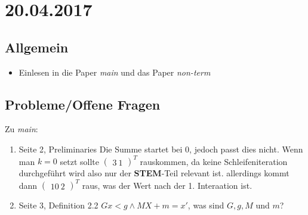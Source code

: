 \section*{20.04.2017}

\subsection*{Allgemein}
\begin{itemize}
	\item Einlesen in die Paper \textit{main} und das Paper \textit{non-term}
\end{itemize}



\subsection*{Probleme/Offene Fragen}
Zu \textit{main}:
\begin{enumerate}
	\item Seite 2, Preliminaries \newline
		Die Summe startet bei 0, jedoch passt dies nicht. Wenn man $k=0$ setzt sollte $\begin{pmatrix}3\ 1\end{pmatrix}^T$ rauskommen, da keine Schleifeniteration durchgeführt wird also nur der \textbf{STEM}-Teil relevant ist. allerdings kommt dann $\begin{pmatrix}10\ 2\end{pmatrix}^T$ raus, was der Wert nach der 1. Interaation ist.
	
	\item Seite 3, Definition 2.2 \newline
		$Gx<g \land MX+m=x'$, was sind $G,g,M$ und $m$?
\end{enumerate}

